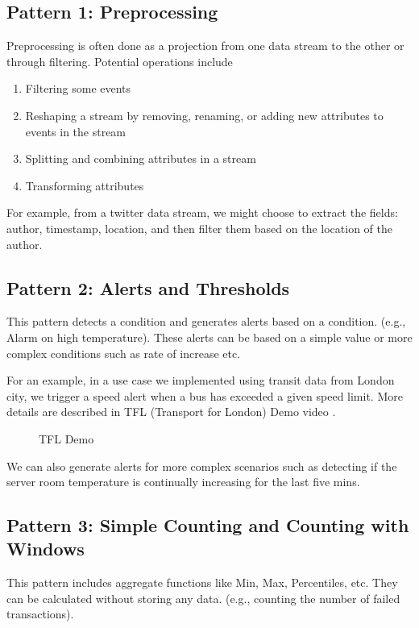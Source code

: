 \documentclass{sig-alternate}
\begin{document}
\subsection{Pattern 1: Preprocessing}
Preprocessing is often done as a projection from one data stream to the other or through filtering. Potential operations include
\begin{enumerate}
\item Filtering some events
\item Reshaping a stream by removing, renaming, or adding new attributes to events in the stream
\item Splitting and combining attributes in a stream 
\item Transforming attributes   
\end{enumerate}

For example, from a twitter data stream, we might choose to extract the fields: author, timestamp, location, and then filter them based on the location of the author. 

\subsection{Pattern 2: Alerts and Thresholds}
This pattern detects a condition and generates alerts based on a condition. (e.g., Alarm on high temperature). These alerts can be based on a simple value or more complex conditions such as rate of increase etc. 

For an example, in a use case we implemented using transit data from London city, we trigger a speed alert  when a bus has exceeded a given speed limit. More details are described in TFL (Transport for London) Demo video \cite{tfl}. 
 
\begin{figure}[!htbp]
\centering
{}
\caption{TFL Demo}
\label{fig:q1}
\end{figure}

We can also generate alerts for more complex scenarios such as detecting if the server room temperature is continually increasing for the last five mins. 

\subsection{Pattern 3: Simple Counting and Counting with Windows}

This pattern includes aggregate functions like Min, Max, Percentiles, etc. They can be calculated without storing any data. (e.g., counting the number of failed transactions). 
\end{document}
